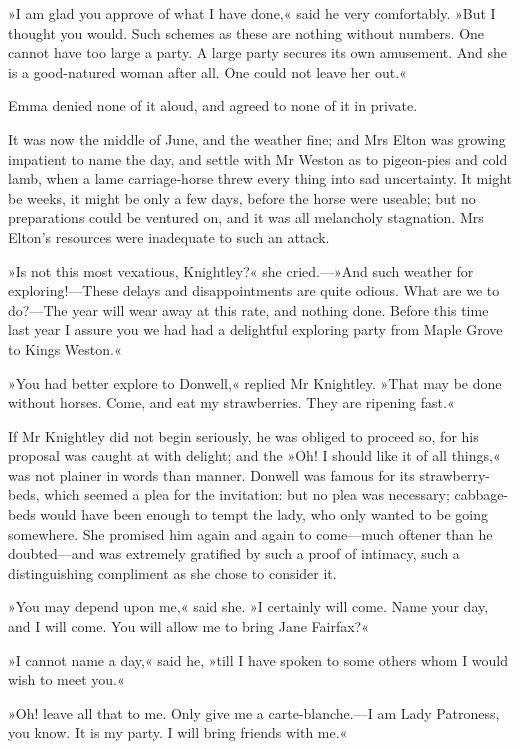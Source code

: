 »I am glad you approve of what I have done,« said he very comfortably. »But I thought you would. Such schemes as these are nothing without numbers. One cannot have too large a party. A large party secures its own amusement. And she is a good-natured woman after all. One could not leave her out.«

Emma denied none of it aloud, and agreed to none of it in private.

It was now the middle of June, and the weather fine; and Mrs Elton was growing impatient to name the day, and settle with Mr Weston as to pigeon-pies and cold lamb, when a lame carriage-horse threw every thing into sad uncertainty. It might be weeks, it might be only a few days, before the horse were useable; but no preparations could be ventured on, and it was all melancholy stagnation. Mrs Elton's resources were inadequate to such an attack.

»Is not this most vexatious, Knightley?« she cried.—»And such weather for exploring!—These delays and disappointments are quite odious. What are we to do?—The year will wear away at this rate, and nothing done. Before this time last year I assure you we had had a delightful exploring party from Maple Grove to Kings Weston.«

»You had better explore to Donwell,« replied Mr Knightley. »That may be done without horses. Come, and eat my strawberries. They are ripening fast.«

If Mr Knightley did not begin seriously, he was obliged to proceed so, for his proposal was caught at with delight; and the »Oh! I should like it of all things,« was not plainer in words than manner. Donwell was famous for its strawberry-beds, which seemed a plea for the invitation: but no plea was necessary; cabbage-beds would have been enough to tempt the lady, who only wanted to be going somewhere. She promised him again and again to come—much oftener than he doubted—and was extremely gratified by such a proof of intimacy, such a distinguishing compliment as she chose to consider it.

»You may depend upon me,« said she. »I certainly will come. Name your day, and I will come. You will allow me to bring Jane Fairfax?«

»I cannot name a day,« said he, »till I have spoken to some others whom I would wish to meet you.«

»Oh! leave all that to me. Only give me a carte-blanche.—I am Lady Patroness, you know. It is my party. I will bring friends with me.«

